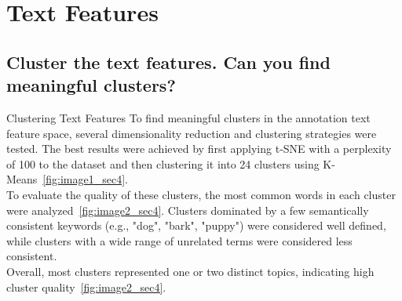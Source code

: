 
\section{Text Features}
\label{sec:Text Features}
\subsection{Cluster the text features. Can you find meaningful clusters?}
\label{sec:Text Features:a}
 Clustering Text Features
To find meaningful clusters in the annotation text feature space, several dimensionality reduction and clustering strategies were tested. The best results were achieved by first applying t-SNE with a perplexity of 100 to the dataset and then clustering it into 24 clusters using K-Means~\ref{fig:image1_sec4}. \\
To evaluate the quality of these clusters, the most common words in each cluster were analyzed~\ref{fig:image2_sec4}. Clusters dominated by a few semantically consistent keywords (e.g., "dog", "bark", "puppy") were considered well defined, while clusters with a wide range of unrelated terms were considered less consistent.\\
Overall, most clusters represented one or two distinct topics, indicating high cluster quality~\ref{fig:image2_sec4}.


